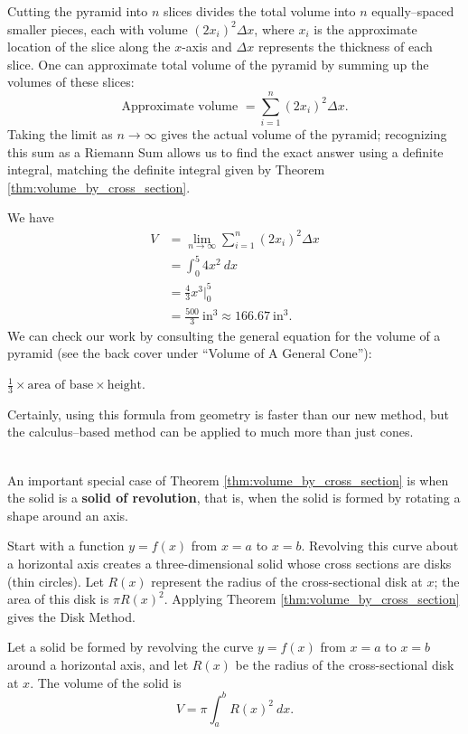 {Cutting the pyramid into $n$ slices divides the total volume into $n$ equally--spaced smaller pieces, each with volume $(2x_i)^2\Delta x$, where $x_i$ is the approximate location of the slice along the $x$-axis and $\Delta x$ represents the thickness of each slice. One can approximate total volume of the pyramid by summing up the volumes of these slices:
$$\text{Approximate volume } = \sum_{i=1}^n (2x_i)^2\Delta x.$$
Taking the limit as $n\to\infty$ gives the actual volume of the pyramid; recognizing this sum as a Riemann Sum allows us to find the exact answer using a definite integral, matching the definite integral given by Theorem \ref{thm:volume_by_cross_section}.

We have 
\begin{align*} V &= \lim_{n\to\infty} \sum_{i=1}^n (2x_i)^2\Delta x\\
							&= \int_0^5 4x^2\ dx\\
				&= \frac43x^3\Big|_0^5 \\
				&=\frac{500}{3}\ \text{in}^3 \approx 166.67\ \text{in}^3.
\end{align*}
We can check our work by consulting the general equation for the volume of a pyramid (see the back cover under ``Volume of A General Cone''): 

\hfill $\frac13\times \text{area of base}\times \text{height}$.\hfill \null

\noindent Certainly, using this formula from geometry is faster than our new method, but the calculus--based method can be applied to much more than just cones.
}\\

An important special case of Theorem \ref{thm:volume_by_cross_section} is when the solid is a \textbf{solid of revolution}, that is, when the solid is formed by rotating a shape around an axis.

Start with a function $y=f(x)$ from $x=a$ to $x=b$. Revolving this curve about a horizontal axis creates a three-dimensional solid whose cross sections are disks (thin circles). Let $R(x)$ represent the radius of the cross-sectional disk at $x$; the area of this disk is $\pi R(x)^2$. Applying Theorem \ref{thm:volume_by_cross_section} gives the Disk Method.

{Let a solid be formed by revolving the curve $y=f(x)$ from $x=a$ to $x=b$ around a horizontal axis, and let $R(x)$ be the radius of the cross-sectional disk at $x$. The volume of the solid is
$$V = \pi \int_a^b R(x)^2\ dx.$$
}

